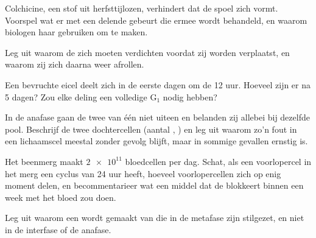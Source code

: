 \begin{exercise}[$\star\star$]\label{exo:g11:cell-cycle-mitosis:9}
Colchicine, een stof uit herfsttijlozen, verhindert dat de spoel zich
vormt. Voorspel wat er met een delende  gebeurt die ermee wordt
behandeld, en waarom biologen haar gebruiken om  te maken.
\end{exercise}

\begin{exercise}[$\star\star$]\label{exo:g11:cell-cycle-mitosis:10}
Leg uit waarom de  zich moeten verdichten voordat zij worden
verplaatst, en waarom zij zich daarna weer afrollen.
\end{exercise}

\begin{exercise}[$\star\star$]\label{exo:g11:cell-cycle-mitosis:11}
Een bevruchte eicel deelt zich in de eerste dagen om de 12 uur. Hoeveel
 zijn er na 5 dagen? Zou elke deling een volledige $\mathrm{G_1}$
nodig hebben?
\end{exercise}

\begin{exercise}[$\star\star\star$]\label{exo:g11:cell-cycle-mitosis:12}
In de anafase gaan de twee  van één  niet uiteen en
belanden zij allebei bij dezelfde pool. Beschrijf de twee dochtercellen
(aantal , ) en leg uit waarom zo'n fout in een lichaamscel
meestal zonder gevolg blijft, maar in sommige gevallen ernstig is.
\end{exercise}

\begin{exercise}[$\star\star\star$]\label{exo:g11:cell-cycle-mitosis:13}
Het beenmerg maakt $\num{2e11}$ bloedcellen per dag. Schat, als een
voorlopercel in het merg een cyclus van 24 uur heeft, hoeveel
voorlopercellen zich op enig moment delen, en becommentarieer wat een
middel dat de  blokkeert binnen een week met het bloed zou doen.
\end{exercise}

\begin{exercise}[$\star\star\star$]\label{exo:g11:cell-cycle-mitosis:14}
Leg uit waarom een  wordt gemaakt van  die in de metafase
zijn stilgezet, en niet in de interfase of de anafase.
\end{exercise}

